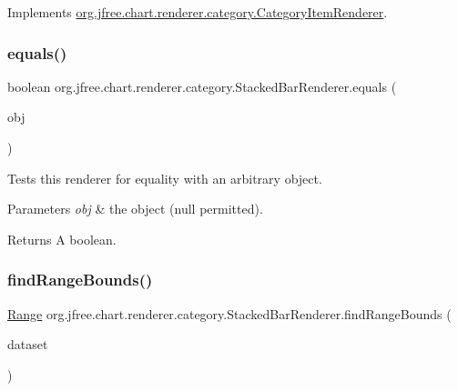 Implements \mbox{\hyperlink{interfaceorg_1_1jfree_1_1chart_1_1renderer_1_1category_1_1_category_item_renderer_ac18a046a47d2b991ab2c968ce3363aea}{org.\+jfree.\+chart.\+renderer.\+category.\+Category\+Item\+Renderer}}.

\mbox{\label{classorg_1_1jfree_1_1chart_1_1renderer_1_1category_1_1_stacked_bar_renderer_ae49ac59abfe81a9b61ec3c7067b15b3c}} 
\subsubsection{\texorpdfstring{equals()}{equals()}}
{\footnotesize\ttfamily boolean org.\+jfree.\+chart.\+renderer.\+category.\+Stacked\+Bar\+Renderer.\+equals (\begin{DoxyParamCaption}\item[{Object}]{obj }\end{DoxyParamCaption})}

Tests this renderer for equality with an arbitrary object.


\begin{DoxyParams}{Parameters}
{\em obj} & the object ({\ttfamily null} permitted).\\
\hline
\end{DoxyParams}
\begin{DoxyReturn}{Returns}
A boolean. 
\end{DoxyReturn}
\mbox{\label{classorg_1_1jfree_1_1chart_1_1renderer_1_1category_1_1_stacked_bar_renderer_a46a38af7e1841b7c0259f5ef4a7f1a24}} 
\subsubsection{\texorpdfstring{find\+Range\+Bounds()}{findRangeBounds()}}
{\footnotesize\ttfamily \mbox{\hyperlink{classorg_1_1jfree_1_1data_1_1_range}{Range}} org.\+jfree.\+chart.\+renderer.\+category.\+Stacked\+Bar\+Renderer.\+find\+Range\+Bounds (\begin{DoxyParamCaption}\item[{\mbox{\hyperlink{interfaceorg_1_1jfree_1_1data_1_1category_1_1_category_dataset}{Category\+Dataset}}}]{dataset }\end{DoxyParamCaption})}

